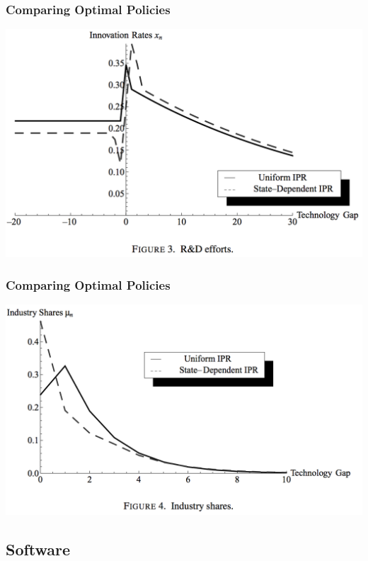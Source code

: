 \documentclass{beamer}
\begin{document}
\begin{frame}[t]\frametitle{Comparing Optimal Policies} 
  \begin{center}
    \includegraphics[scale=.28]{full_ipr_rnd.png}
    \label{fig:full_ipr_rnd}
  \end{center}
\end{frame}

\begin{frame}[t]\frametitle{Comparing Optimal Policies} 
  \begin{center}
    \includegraphics[scale=.28]{full_ipr_distbn.png}
    \label{fig:full_ipr_distbn}
  \end{center}
\end{frame}


\subsection{Software}
\label{sub:software}

\end{document}
